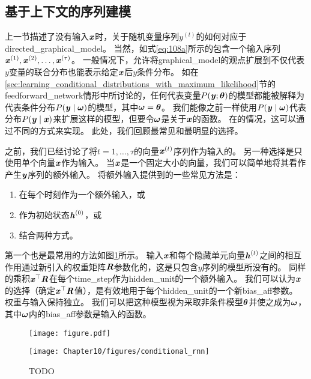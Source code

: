 \subsection{基于上下文的序列建模}
\label{sec:modeling_sequences_conditioned_on_context_with_rnns}
上一节描述了没有输入$\boldsymbol{\mathit{x}}$时，关于随机变量序列$y^{(t)}$的如何对应于\gls{directed_graphical_model}。
当然，如式\eqref{eq:108a}所示的包含一个输入序列$\boldsymbol{\mathit{x}}^{(1)},\boldsymbol{\mathit{x}}^{(2)},\dots,\boldsymbol{\mathit{x}}^{(\tau)}$。
一般情况下，允许将\gls{graphical_model}的观点扩展到不仅代表$y$变量的联合分布也能表示给定$\boldsymbol{\mathit{x}}$后$y$条件分布。
如在\ref{sec:learning_conditional_distributions_with_maximum_likelihood}节的\gls{feedforward_network}情形中所讨论的，任何代表变量$P(\boldsymbol{\mathit{y}};\boldsymbol{\theta})$的模型都能被解释为代表条件分布$P(\boldsymbol{\mathit{y}} \mid \boldsymbol{\omega})$的模型，其中$\boldsymbol{\omega}=\boldsymbol{\theta}$。
我们能像之前一样使用$P(\boldsymbol{\mathit{y}} \mid \boldsymbol{\omega})$代表分布$P(\boldsymbol{\mathit{y}} \mid \boldsymbol{\mathit{x}})$来扩展这样的模型，但要令$\boldsymbol{\omega}$是关于$\boldsymbol{\mathit{x}}$的函数。
在的情况，这可以通过不同的方式来实现。
此处，我们回顾最常见和最明显的选择。


之前，我们已经讨论了将$t =1, \dots, \tau$的向量$\boldsymbol{\mathit{x}}^{(t)}$序列作为输入的。
另一种选择是只使用单个向量$\boldsymbol{\mathit{x}}$作为输入。
当$\boldsymbol{\mathit{x}}$是一个固定大小的向量，我们可以简单地将其看作产生$\boldsymbol{\mathit{y}}$序列的额外输入。
将额外输入提供到的一些常见方法是：
\begin{enumerate}
 \item 在每个时刻作为一个额外输入，或
 \item 作为初始状态$\boldsymbol{\mathit{h}}^{(0)}$，或
 \item 结合两种方式。
\end{enumerate}

第一个也是最常用的方法如图\ref{fig:chap10_conditional_rnn}所示。
输入$\boldsymbol{\mathit{x}}$和每个隐藏单元向量$\boldsymbol{\mathit{h}}^{(t)}$之间的相互作用通过新引入的权重矩阵$\boldsymbol{\mathit{R}}$参数化的，这是只包含$y$序列的模型所没有的。
同样的乘积$\boldsymbol{\mathit{x}}^\top\boldsymbol{\mathit{R}}$在每个\gls{time_step}作为\gls{hidden_unit}的一个额外输入。
我们可以认为$\boldsymbol{\mathit{x}}$的选择（确定$\boldsymbol{\mathit{x}}^\top\boldsymbol{\mathit{R}}$值），是有效地用于每个\gls{hidden_unit}的一个新\gls{bias_aff}参数。
权重与输入保持独立。
我们可以把这种模型视为采取非条件模型$\boldsymbol{\theta}$并使之成为$\boldsymbol{\omega}$，其中$\boldsymbol{\omega}$内的\gls{bias_aff}参数是输入的函数。

\begin{figure}[!htb]
\ifOpenSource
\centerline{\texttt{[image: figure.pdf]}}
\else
\centerline{\texttt{[image: Chapter10/figures/conditional\_rnn]}}
\fi
\caption{TODO}
\label{fig:chap10_conditional_rnn}
\end{figure}

